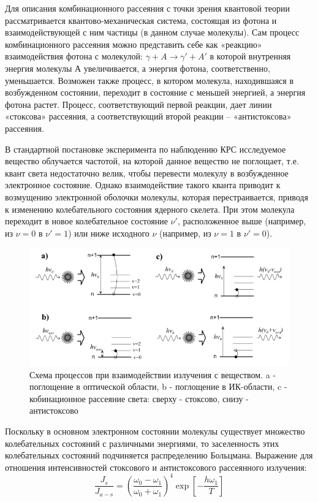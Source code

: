 \documentclass[a4paper,12pt]{article} %
\begin{document}
Для описания комбинационного рассеяния с точки зрения квантовой
теории рассматривается квантово-механическая система, состоящая из фотона и
взаимодействующей с ним частицы (в данном случае молекулы). Сам процесс комбинационного рассеяния можно представить себе как
«реакцию» взаимодействия фотона с молекулой: $\gamma + A \rightarrow \gamma' + A'$ в которой
внутренняя энергия молекулы $А$ увеличивается, а энергия
фотона, соответственно, уменьшается. Возможен также процесс, в котором молекула, находившаяся в возбужденном
состоянии, переходит в состояние с меньшей энергией, а энергия фотона растет. Процесс, соответствующий первой реакции, дает
линии «стоксова» рассеяния, а соответствующий второй реакции –
«антистоксова» рассеяния.

В стандартной постановке
эксперимента по наблюдению КРС исследуемое вещество облучается частотой,
на которой данное вещество не поглощает, т.е. квант света недостаточно велик,
чтобы перевести молекулу в возбужденное электронное состояние. Однако
взаимодействие такого кванта приводит к возмущению электронной оболочки
молекулы, которая перестраивается, приводя к изменению колебательного
состояния ядерного скелета. При этом молекула переходит в новое
колебательное состояние $\nu'$, расположенное выше (например, из $\nu=0$ в $\nu'=1$)
или ниже исходного $\nu$ (например, из $\nu=1$ в $\nu'=0$).

\begin{figure}[h!]
    \centering
    \includegraphics[scale=1]{поглощение-рассеяние.png}
    \caption{Схема процессов при взаимодействии излучения с веществом. a - поглощение в оптической области, b - поглощение в ИК-области, c - кобинационное рассеяние света: сверху - стоксово, снизу - антистоксово}
    \label{Ber}
\end{figure}

Поскольку в основном электронном состоянии молекулы существует
множество колебательных состояний с различными энергиями, то заселенность
этих колебательных состояний подчиняется распределению Больцмана. Выражение для отношения
интенсивностей стоксового и антистоксового рассеянного излучения:
\[\frac{J_s}{J_{a-s}}=\left(\frac{\omega_0 - \omega_1}{\omega_0 + \omega_1}\right)^4\exp{\left[-\frac{h\omega_1}{T}\right]}\]
\end{document}
